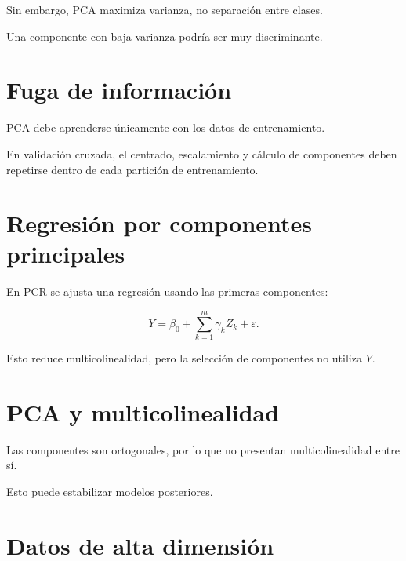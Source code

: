 \documentclass[
  spanish,
  10.5pt,
  letterpaper,
  DIV=11,
  numbers=noendperiod,
  oneside,
  open=any]{scrreprt}
\theoremstyle{definition}
\theoremstyle{definition}
\theoremstyle{plain}
\theoremstyle{remark}
\begin{document}
Sin embargo, PCA maximiza varianza, no separación entre clases.

Una componente con baja varianza podría ser muy discriminante.

\section*{Fuga de información}\label{fuga-de-informaciuxf3n-1}


PCA debe aprenderse únicamente con los datos de entrenamiento.

En validación cruzada, el centrado, escalamiento y cálculo de
componentes deben repetirse dentro de cada partición de entrenamiento.

\section*{Regresión por componentes
principales}\label{regresiuxf3n-por-componentes-principales}


En PCR se ajusta una regresión usando las primeras componentes:

\[
Y
=
\beta_0
+
\sum_{k=1}^{m}
\gamma_k Z_k
+
\varepsilon.
\]

Esto reduce multicolinealidad, pero la selección de componentes no
utiliza \(Y\).

\section*{PCA y multicolinealidad}\label{pca-y-multicolinealidad}


Las componentes son ortogonales, por lo que no presentan
multicolinealidad entre sí.

Esto puede estabilizar modelos posteriores.

\section*{Datos de alta dimensión}\label{datos-de-alta-dimensiuxf3n}
\end{document}
